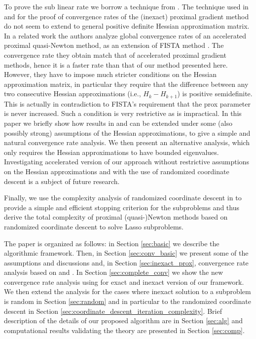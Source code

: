 \documentclass[11pt]{article}
\numberwithin{equation}{section}
\begin{document}
To prove the sub linear rate  we borrow a technique from  \cite{NesterovConvexBook2004, NesterovPolyak, Cartisetal2012}. The technique used in 
  \cite{Beck2009} and \cite{Schmidtetal} for the proof of convergence rates of the (inexact) proximal gradient method do not seem to extend
 to  general positive definite Hessian approximation matrix.  In a  related work \cite{Jiangetal2012}  the authors analyze global convergence rates of an accelerated proximal quasi-Newton method, as an extension of FISTA method \cite{Beck2009}. The convergence rate they obtain match that of accelerated proximal gradient methods, hence it is a faster rate
than that of our method presented here. However,  they have to impose much stricter conditions on the Hessian approximation matrix, in particular they require  that the difference between any two consecutive Hessian approximations (i.e., $H_{k}-H_{k+1}$) is positive semidefinite. This is actually in contradiction to   FISTA's  requirement  that the prox parameter is never increased. Such a condition is very restrictive 
as is impractical. In this paper we briefly show how  results in \cite{Beck2009} and \cite{Schmidtetal}  can be extended under some 
(also possibly strong) assumptions of the Hessian approximations, to give a simple and natural convergence rate analysis. 
We then present an alternative analysis, which only requires the Hessian approximations to have bounded eigenvalues. 
Investigating accelerated version of our approach without restrictive assumptions on the Hessian approximations and with the use 
of randomized coordinate descent is a subject of future research. 

 
 
 

 
 Finally, we use the complexity analysis of randomized coordinate descent in \cite{Richtarik2012} to provide a simple and efficient stopping criterion for the subproblems and thus derive the total complexity of  proximal (quasi-)Newton methods based on randomized coordinate descent to solve Lasso subproblems. 

 
 
 
The paper is organized as follows: in Section \ref{sec:basic}  we describe the  algorithmic framework. Then,  in Section \ref{sec:conv_basic}  we 
present some of the assumptions and discussions and, in Section \ref{sec:inexact_prox},  convergence rate analysis based on \cite{Beck2009} and \cite{Schmidtetal}. 
In  Section \ref{sec:complete_conv} we show the new convergence rate analysis using  \cite{NesterovConvexBook2004, NesterovPolyak, Cartisetal2012} for exact and inexact
version of our framework.  We then extend the analysis for the cases where inexact solution to a subproblem is random in Section \ref{sec:random}
and in particular to the randomized coordinate descent in Section \ref{sec:coordinate_descent_iteration_complexity}. 
Brief description of the details of our  proposed algorithm are in Section \ref{sec:alg} and  computational results  validating the theory are  presented in Section \ref{sec:comp}.
\end{document}
